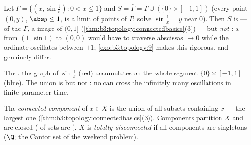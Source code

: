\begin{example}
\label{ex:b3:topology:sinecurve}
Let $\Gamma = \{(x, \sin\frac1x) : 0 < x \leq 1\}$ and $S =
\bar\Gamma = \Gamma \cup (\{0\}\times[-1,1])$ (every point $(0,
y)$, $\abs y \leq 1$, is a limit of points of $\Gamma$: solve
$\sin\frac1x = y$ near $0$). Then $S$ is
\emph{} ---  of the  $\Gamma$, a
 image of $(0, 1]$
(\cref{thm:b3:topology:connectedbasics}(3)) --- but \emph{not
}: a  from $(1, \sin 1)$ to $(0,0)$ would have
to traverse abscissas $\to 0$ while the ordinate oscillates
between $\pm1$; \cref{exo:b3:topology:9} makes this rigorous.
 and  genuinely
differ.
\end{example}

\begin{omfigure}

{\small The : the graph of
$\sin\frac1x$ (red) accumulates on the whole segment
$\{0\}\times[-1,1]$ (blue). The union is  but not
: no   can cross the infinitely
many oscillations in finite parameter time.}
\end{omfigure}

\begin{definition}\label{def:b3:topology:components}
The \emph{connected component} of $x
\in X$ is the union of all  subsets containing $x$ ---
the largest one (\cref{thm:b3:topology:connectedbasics}(3)).
Components partition $X$ and are closed ( of 
sets are ). $X$ is \emph{totally disconnected} if all
components are singletons ($\Q$; the Cantor set of the weekend
problem).
\end{definition}

